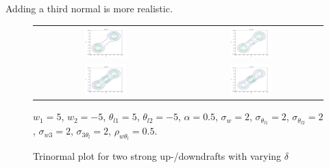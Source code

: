 \documentclass[10pt]{beamer}
\numberwithin{equation}{section}
\begin{document}
    \begin{frame}
        \begin{large}
            Adding a third normal is more realistic.
        \end{large}
        \begin{figure}[!htb]
            \centering
            \begin{tabular}{cc}
                \multicolumn{1}{c}{\includegraphics[width=0.3\textwidth]{include/figures/plot3_1}} &
                \multicolumn{1}{c}{\includegraphics[width=0.3\textwidth]{include/figures/plot3_2}} \\
                \multicolumn{1}{c}{\includegraphics[width=0.3\textwidth]{include/figures/plot3_3}} &
                \multicolumn{1}{c}{\includegraphics[width=0.3\textwidth]{include/figures/plot3_4}} \\
            \end{tabular}
            \caption{Trinormal plot for two strong up-/downdrafts with varying $\delta$}
            \label{fig:plot3}
            $w_1 = 5$, $w_2 = -5$, $\theta_{l1} = 5$, $\theta_{l2} = -5$,
            $\alpha = 0.5$, $\sigma_w = 2$, $\sigma_{\theta_{l1}} = 2$,  $\sigma_{\theta_{l2}} = 2$,
            $\sigma_{w3} = 2$, $\sigma_{3\theta_l} = 2$, $\rho_{w\theta_l} = 0.5$.
        \end{figure}
    \end{frame}
\end{document}
